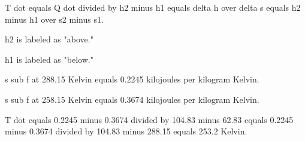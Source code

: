 T dot equals Q dot divided by h2 minus h1 equals delta h over delta s equals h2 minus h1 over s2 minus s1.

h2 is labeled as "above."

h1 is labeled as "below."

s sub f at 288.15 Kelvin equals 0.2245 kilojoules per kilogram Kelvin.

s sub f at 258.15 Kelvin equals 0.3674 kilojoules per kilogram Kelvin.

T dot equals 0.2245 minus 0.3674 divided by 104.83 minus 62.83 equals 0.2245 minus 0.3674 divided by 104.83 minus 288.15 equals 253.2 Kelvin.